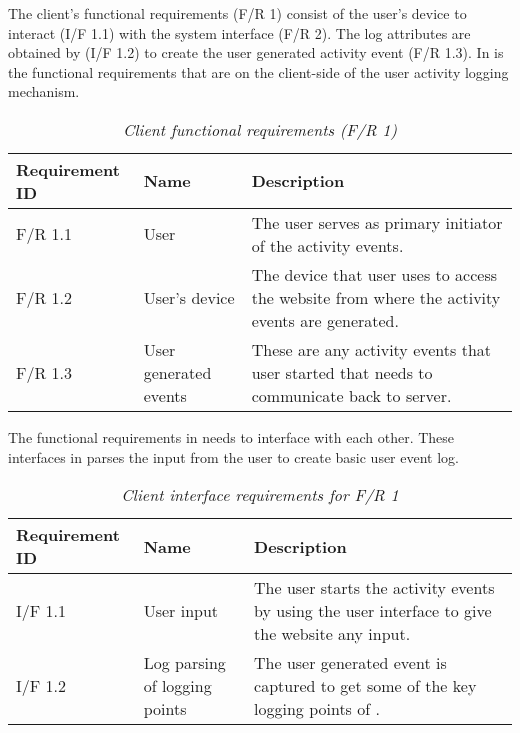 \clearpage

The client's functional requirements (F/R 1) consist of the user's device to interact (I/F 1.1) with the system interface (F/R 2). The log attributes are obtained by (I/F 1.2) to create the user generated activity event (F/R 1.3). In  is the functional requirements that are on the client-side of the user activity logging mechanism.

\begin{table}[!htb]
	\centering
	\small
	\caption[Client functional requirements]
	{\textit{Client functional requirements (F/R 1)}}
	\label{tbl:Ch2_Client_Functional_Requirements}
	\begin{tabularx}{\textwidth}{|l|l|X|}
		\hline \textbf{Requirement ID} & \textbf{Name} & \textbf{Description} \\
		\hline F/R 1.1 & User & The user serves as primary initiator of the activity events.\\
		\hline F/R 1.2 & User's device & The device that user uses to access the website from where the activity events are generated.\\
		\hline F/R 1.3 & User generated events & These are any activity events that user started that needs to communicate back to server.\\
		\hline
	\end{tabularx}
\end{table}

The functional requirements in  needs to interface with each other. These interfaces in  parses the input from the user to create basic user event log.

\begin{table}[!htb]
	\centering
	\small
	\caption[Client interface requirements]
	{\textit{Client interface requirements for F/R 1}}
	\label{tbl:Ch2_Client_Interface_Requirements}
	\begin{tabularx}{\textwidth}{|l|l|X|}
		\hline \textbf{Requirement ID} & \textbf{Name} & \textbf{Description} \\
		\hline I/F 1.1 & User input & The user starts the activity events by using the user interface to give the website any input.\\
		\hline I/F 1.2 & Log parsing of logging points & The user generated event is captured to get some of the key logging points of \Cref{tbl:CH1_Log_Basic_Attributes}.\\
		\hline
	\end{tabularx}
\end{table}

